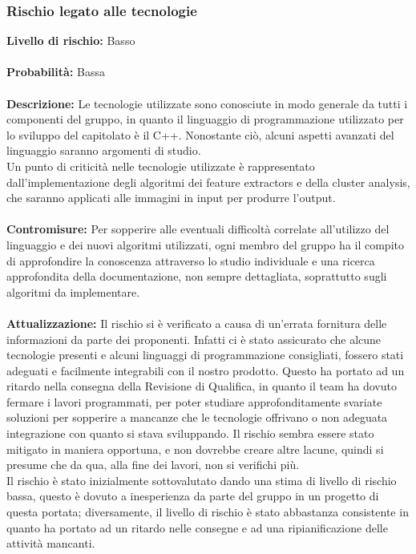 	\subsubsection{Rischio legato alle tecnologie}
	\label{AnalisiDeiRischi_Tecnologie}
		\textbf{Livello di rischio:} Basso
		\\ \\
		\textbf{Probabilità:} Bassa
		\\ \\
		\textbf{Descrizione:} Le tecnologie utilizzate sono conosciute in modo generale da tutti i componenti del gruppo, in quanto il linguaggio di programmazione utilizzato per lo sviluppo del capitolato è il C++\glossario. Nonostante ciò, alcuni aspetti avanzati del linguaggio saranno argomenti di studio.\\
		Un punto di criticità nelle tecnologie utilizzate è rappresentato dall'implementazione degli algoritmi dei feature extractors\glossario{} e della cluster analysis\glossario{}, che saranno applicati alle immagini in input per produrre l'output.
		\\ \\
		\textbf{Contromisure:} Per sopperire alle eventuali difficoltà correlate all'utilizzo del linguaggio e dei nuovi algoritmi utilizzati, ogni membro del gruppo ha il compito di approfondire la conoscenza attraverso lo studio individuale e una ricerca approfondita della documentazione, non sempre dettagliata, soprattutto sugli algoritmi da implementare.
		\\ \\
		\textbf{Attualizzazione:} Il rischio si è verificato a causa di un'errata fornitura delle informazioni da parte dei proponenti. Infatti ci è stato assicurato che alcune tecnologie presenti e alcuni linguaggi di programmazione consigliati, fossero stati adeguati e facilmente integrabili con il nostro prodotto. Questo ha portato ad un ritardo nella consegna della Revisione di Qualifica, in quanto il team ha dovuto fermare i lavori programmati, per poter studiare approfonditamente svariate soluzioni per sopperire a mancanze che le tecnologie offrivano o non adeguata integrazione con quanto si stava sviluppando. Il rischio sembra essere stato mitigato in maniera opportuna, e non dovrebbe creare altre lacune, quindi si presume che da qua, alla fine dei lavori, non si verifichi più.\\ Il rischio è stato inizialmente sottovalutato dando una stima di livello di rischio bassa, questo è dovuto a inesperienza da parte del gruppo in un progetto di questa portata; diversamente, il livello di rischio è stato abbastanza consistente in quanto ha portato ad un ritardo nelle consegne e ad una ripianificazione delle attività mancanti.
		
